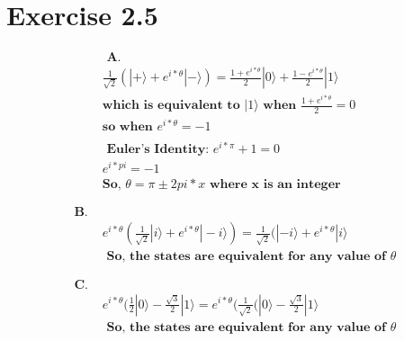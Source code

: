 \documentclass{article}
\def\ket#1{|#1\rangle}
\begin{document}
\section{Exercise 2.5 }
\begin{align*}
&\textbf{ A. } \\ 
& \frac{1}{\sqrt{2}}(\ket{+} + e^{i*\theta}\ket{-}) = \frac{1 + e^{i*\theta}}{2}\ket{0} + \frac{1 - e^{i*\theta}}{2}\ket{1} \\ 
&\textbf{which is equivalent to } \ket{1} \textbf{ when } \frac{1 + e^{i*\theta}}{2} = 0 
\\ &\textbf{so when } e^{i*\theta} = -1 
\\ \\ 
& \textbf{ Euler's Identity: } e^{i*\pi} + 1 = 0 \\ 
& e^{i*pi} = -1 \\ &\textbf{So, } \theta = \pi \pm{2pi*x} \textbf{ where x is an integer} 
\\ \\ \\ 
\textbf{ B. } \\ 
& e^{i*\theta}(\frac{1}{\sqrt{2}}\ket{i} + e^{i*\theta}\ket{-i}) = \frac{1}{\sqrt{2}}(\ket{-i} + e^{i*\theta}\ket{i} \\ 
&\textbf{ So, the states are equivalent for any value of } \theta \\ \\ \\ 
\textbf{ C. } \\ 
& e^{i*\theta}(\frac{1}{2}\ket{0} - \frac{\sqrt{3}}{2}\ket{1} = e^{i*\theta}(\frac{1}{\sqrt{2}}(\ket{0} - \frac{\sqrt{3}}{2}\ket{1} \\ 
&\textbf{ So, the states are equivalent for any value of } \theta \\ \\ \\ 
\end{align*}
\end{document}

